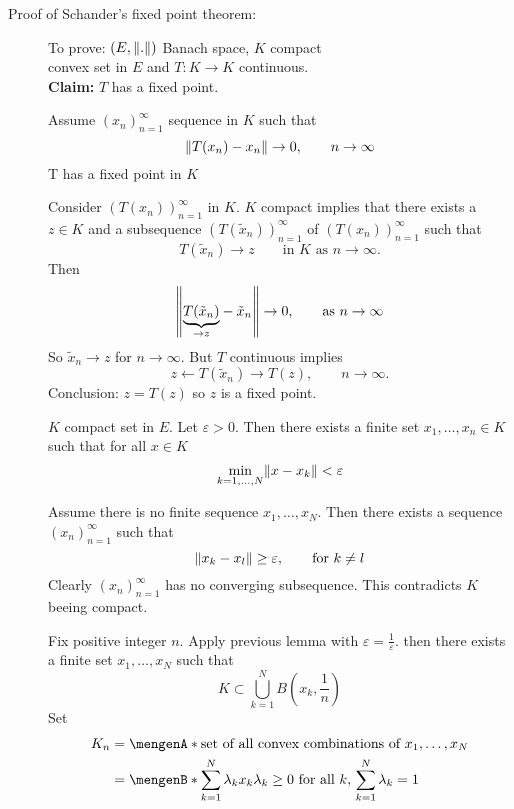 \begin{description}
	\item[Proof of Schander's fixed point theorem:]
	To prove: $(E, \norm{.})$ Banach space, $K$ compact \\ convex set in $E$ and $T: K \to K$ continuous. \\
	\textbf{Claim:} \text{    }     $T$ has a fixed point. \\
	\begin{beweis}
		\begin{lemma*}
			Assume $(x_n)_{n=1}^{\infty}$ sequence in $K$ such that
			\[
				\norm{T(x_n)-x_n} \to 0, \qquad  n \to \infty
			\]
			T has a fixed point in $K$
		\end{lemma*}
		\begin{beweis}
			Consider $(T(x_n))_{n=1}^{\infty}$ in $K$. $K$ compact implies that there exists a $z \in K$ and a subsequence $(T(\tilde x_n))_{n=1}^{\infty}$ of $(T(x_n))_{n=1}^{\infty}$ such that 
			\[
				T(\tilde x_n) \to  z \qquad  \text{in $K$ as }n \to \infty.
			\]
			Then
			\[
				\norm{\underset{\to z}{\underbrace{T(\tilde x_n)}}- \tilde x_n} \to 0, \qquad \text{as }n \to \infty
			\]
			So $\tilde x_n \to z$ for $n \to \infty$. But $T$ continuous implies 
			\[
				z \leftarrow T( \tilde x_n) \to T(z), \qquad  n \to \infty.
			\]
			Conclusion: $z = T(z)$ so $z$ is a fixed point.
		\end{beweis}
		\begin{lemma*}
			$K$ compact set in $E$. Let $\varepsilon >0$. Then there exists a finite set $x_1,\dots,x_n \in K$ such that for all $x \in K$
			\[
				\min\limits_{k = 1, \dots, N} \norm{x- x_k} < \varepsilon
			\] 
		\end{lemma*}
		\begin{beweis}
			Assume there is no finite sequence $x_1, \dots, x_N$. Then there exists a sequence $(x_n)_{n=1}^{\infty}$ such that
			\[
				\norm{x_k-x_l} \geq \varepsilon, \qquad \text{for }k \neq l
			\]
			Clearly $(x_n)_{n=1}^{\infty}$ has no converging subsequence. This contradicts $K$ beeing compact.
		\end{beweis}
		Fix positive integer $n$. Apply previous lemma with $\varepsilon = \frac{1}{\varepsilon}$. then there exists a finite set $x_1,\dots,x_N$ such that
		\[
			K \subset \bigcup_{k=1}^N B \left(x_k, \frac{1}{n} \right)
		\]
		Set 
		\begin{align*}
			K_n  &= \set{\text{set of all convex combinations of $x_1, \dots,x_N$}} \\
			&= \set[\sum_{k=1}^{N} \lambda_k x_k]{\lambda_k \geq 0 \text{ for all }k,\, \sum_{k=1}^{N}\lambda_k = 1}

\end{align*}
\end{beweis}
\end{description}
